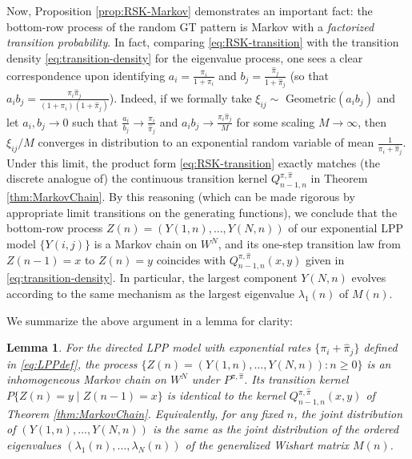 \documentclass[letterpaper,11pt,oneside,reqno]{article}
\numberwithin{equation}{section}
\newtheorem{lemma}[proposition]{Lemma}
\theoremstyle{definition}
\begin{document}
Now, Proposition \ref{prop:RSK-Markov} demonstrates an important fact: the bottom-row process of the random GT pattern is Markov with a \emph{factorized transition probability}. In fact, comparing \eqref{eq:RSK-transition} with the transition density \eqref{eq:transition-density} for the eigenvalue process, one sees a clear correspondence upon identifying $a_i = \frac{\pi_i}{1+\pi_i}$ and $b_j = \frac{\hat\pi_j}{1+\hat\pi_j}$ (so that $a_i b_j = \frac{\pi_i \hat\pi_j}{(1+\pi_i)(1+\hat\pi_j)}$). Indeed, if we formally take $\xi_{ij}\sim$ Geometric$(a_i b_j)$ and let $a_i,b_j \to0$ such that $\frac{a_i}{b_j}\to \frac{\pi_i}{\hat\pi_j}$ and $a_i b_j \to \frac{\pi_i \hat\pi_j}{M}$ for some scaling $M\to\infty$, then $\xi_{ij}/M$ converges in distribution to an exponential random variable of mean $\frac{1}{\pi_i + \hat\pi_j}$. Under this limit, the product form \eqref{eq:RSK-transition} exactly matches (the discrete analogue of) the continuous transition kernel $Q^{\pi,\hat\pi}_{n-1,n}$ in Theorem \ref{thm:MarkovChain}. By this reasoning (which can be made rigorous by appropriate limit transitions on the generating functions), we conclude that the bottom-row process $Z(n) = (Y(1,n),\dots,Y(N,n))$ of our exponential LPP model $\{Y(i,j)\}$ is a Markov chain on $W^N$, and its one-step transition law from $Z(n-1)=x$ to $Z(n)=y$ coincides with $Q^{\pi,\hat\pi}_{n-1,n}(x,y)$ given in \eqref{eq:transition-density}. In particular, the largest component $Y(N,n)$ evolves according to the same mechanism as the largest eigenvalue $\lambda_1(n)$ of $M(n)$.

We summarize the above argument in a lemma for clarity:

\begin{lemma}\label{lem:LPP-Markov}
For the directed LPP model with exponential rates $\{\pi_i + \hat\pi_j\}$ defined in \eqref{eq:LPPdef}, the process $\{Z(n) = (Y(1,n),\dots,Y(N,n)) : n\ge0\}$ is an inhomogeneous Markov chain on $W^N$ under $P^{\pi,\hat\pi}$. Its transition kernel $P\{Z(n)=y \mid Z(n-1)=x\}$ is identical to the kernel $Q^{\pi,\hat\pi}_{n-1,n}(x,y)$ of Theorem \ref{thm:MarkovChain}. Equivalently, for any fixed $n$, the joint distribution of $(Y(1,n),\dots,Y(N,n))$ is the same as the joint distribution of the ordered eigenvalues $(\lambda_1(n),\dots,\lambda_N(n))$ of the generalized Wishart matrix $M(n)$.
\end{lemma}
\end{document}

